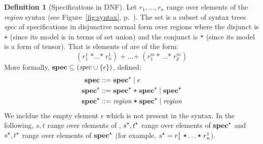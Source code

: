 \documentclass[9pt]{sigplanconf}
\newcounter{block}
\theoremstyle{definition}
\newtheorem{definition}[block]{Definition}
\newcommand{\term}[1]{\texttt{#1}}
\begin{document}
\begin{definition}[Specifications in DNF]
Let $r_1, ..., r_n$ range over elements of the \textit{region}
syntax (see Figure~\ref{fig:syntax}, p.~\pageref{fig:syntax}).
The set \specDNF{} is a subset of syntax trees \textit{spec}
of specifications in disjunctive normal form over regions 
where the disjunct is \term{+} (since its model is in terms of set
union) and the conjunct is \term{*} (since its model is a form of tensor).
That is elements of \specDNF{} are of the form:
\[
(r^1_{1} \; \term{*} \ldots \term{*} \; r^1_n)\; \term{+} \; \ldots 
\term{+} \; (r^m_1 \, \term{*} \; \ldots \term{*} \; r^m_p)
\]
More formally, $\textbf{spec} \subseteq (\textit{spec} \cup \{\epsilon\})$, defined:
\begin{align*}
\specDNF{} & ::= \tySum{\specDNF} \mid \epsilon \\
\tySum{\specDNF} & ::= \tyProd{\specDNF} \; \term{+} \; \tySum{\specDNF} \mid
  \tyProd{\specDNF} \\
\tyProd{\specDNF} & ::= \textit{region} \; \term{*} \; \tyProd{\specDNF} \mid
   \textit{region}
\end{align*}
We incldue the empty element $\epsilon$ which is not present in the
syntax. 
In the following, $s, t$ range over elements of
\specDNF{}, $\tySum{s}, \tySum{t}$ range over elements of 
$\tySum{\specDNF}$ and $\tyProd{s}, \tyProd{t}$ range over elements
of $\tyProd{\specDNF}$ (for example, $\tyProd{s} = r^1_{1} \; \term{*}
\ldots \term{*} \; r^1_n$).
\end{definition}

\newcommand{\exactR}{\mathsf{exact}\;}
\newcommand{\exact}[1]{\exactR(#1)}
\newcommand{\upperB}[1]{\mathsf{upper}\;(#1)}
\end{document}
